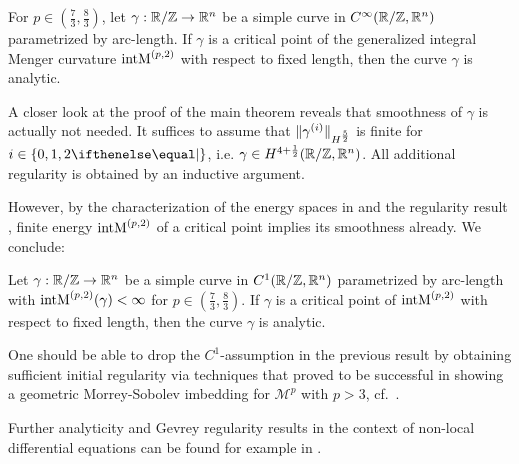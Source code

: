 \begin{theorem}\label{thm:main}
	For $p\in (\tfrac 73, \tfrac 83)$, let $\gamma :\mathbb{R}/\mathbb{Z}\rightarrow \mathbb{R}^n$ be a simple curve in $C^\infty(\mathbb{R}/\mathbb{Z},\mathbb{R}^n)$ parametrized by arc-length. 
	If $\gamma$ is a critical point of the generalized integral Menger curvature  $\operatorname{intM}^{\left(p,2\right)}$ 
	with respect to fixed length,
	then the curve $\gamma$ is analytic. 
\end{theorem}

A closer look at the proof of the main theorem reveals that smoothness of $\gamma$ is actually not needed. It suffices to assume that $\norm[H^{\frac 5 2}]{\gamma^{(i)}}$ is finite for $i \in \set{0,1,2}$, i.e. $\gamma \in H^{4 + \frac 1 2}(\mathbb{R}/\mathbb{Z},\mathbb{R}^n)$. All additional regularity is obtained by an inductive argument.

However, by the characterization of the energy spaces in \cite[Theorem~1]{BlattReiter:2015:Menger} and the regularity result , finite energy $\operatorname{intM}^{\left(p,2\right)}$ of a critical point implies its smoothness already. We conclude:

\begin{corollary}\label{cor:main}
	Let  $\gamma :\mathbb{R}/\mathbb{Z}\rightarrow \mathbb{R}^n$ be a simple curve in $C^1(\mathbb{R}/\mathbb{Z},\mathbb{R}^n)$ parametrized by arc-length  with $\operatorname{intM}^{\left(p,2\right)} (\gamma) < \infty$ for $p\in(\tfrac 73, \tfrac 83)$.
	If $\gamma$ is a critical point of $\operatorname{intM}^{\left(p,2\right)}$ with respect to fixed length, then the curve $\gamma$ is analytic.
\end{corollary}

One should be able to drop the $C^1$-assumption in the previous result by obtaining sufficient initial regularity via techniques that proved to be successful in showing a geometric Morrey-Sobolev imbedding for $\mathcal{M}^p$ with $p>3$, cf.~\cite[Theorem~1.2]{StrzeleckiSzumanskavonderMosel:2010:RegularizingandselfavoidanceeffectsofintegralMengercurvature}.

Further analyticity and Gevrey regularity results in the context of non-local differential equations can be found for example in \cite{DallAcquaEtAl:2012,DallAcquaEtAl:2014,AlbaneseEtAl:2015:GevreyRegularityForIntDiffOp,Blatt:2020:AnalyticityIntegroDiffOp,Blatt:2020:AnalyticityNonlinerEllipticPDE}.

